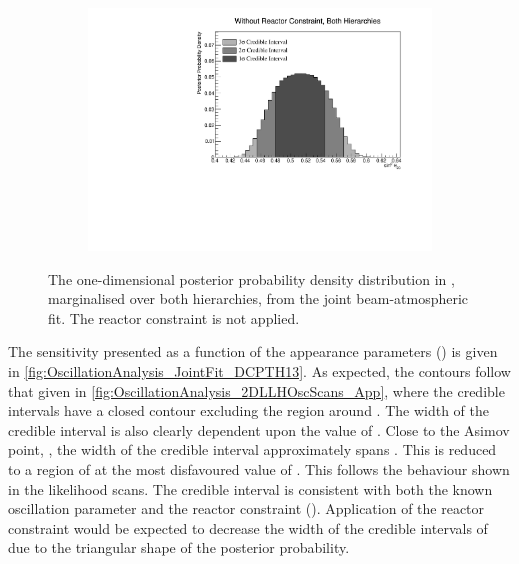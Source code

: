 \begin{figure}[h]
  \begin{subfigure}[t]{0.98\textwidth}
    \includegraphics[width=\textwidth, trim={0mm 0mm 0mm 0mm}, clip,page=1]{Figures/OA/JointFit/Contours_1D_th23_BH_1_woRC_UnSmeared_CredibleInterval.pdf}
  \end{subfigure}
  \caption{The one-dimensional posterior probability density distribution in , marginalised over both hierarchies, from the joint beam-atmospheric fit. The reactor constraint is not applied.}
  \label{fig:OscillationAnalysis_JointFit_TH23}
\end{figure}

The sensitivity presented as a function of the appearance parameters () is given in \autoref{fig:OscillationAnalysis_JointFit_DCPTH13}. As expected, the contours follow that given in \autoref{fig:OscillationAnalysis_2DLLHOscScans_App}, where the \quickmath{2\sigma} credible intervals have a closed contour excluding the region around . The width of the \quickmath{3\sigma} credible interval is also clearly dependent upon the value of . Close to the Asimov point, , the width of the \quickmath{3\sigma} credible interval approximately spans . This is reduced to a region of  at the most disfavoured value of . This follows the behaviour shown in the likelihood scans. The \quickmath{1\sigma} credible interval is consistent with both the known oscillation parameter and the reactor constraint (). Application of the reactor constraint would be expected to decrease the  width of the \quickmath{1\sigma} credible intervals of  due to the triangular shape of the posterior probability. 

